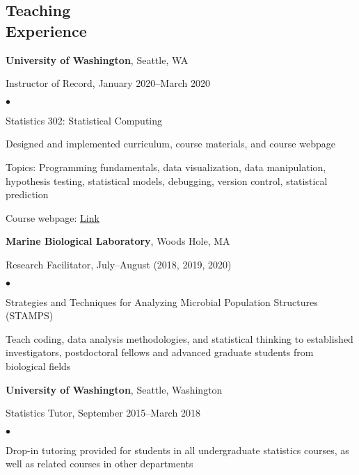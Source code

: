 \documentclass[margin,centered]{res}
\newenvironment{list1}{
  \begin{list}{\ding{113}}{%
      \setlength{\itemsep}{0in}
      \setlength{\parsep}{0in} \setlength{\parskip}{0in}
      \setlength{\topsep}{0in} \setlength{\partopsep}{0in}
      \setlength{\leftmargin}{0.17in}}}{\end{list}}
\newenvironment{list2}{
  \begin{list}{$\bullet$}{%
      \setlength{\itemsep}{0in}
      \setlength{\parsep}{0in} \setlength{\parskip}{0in}
      \setlength{\topsep}{0in} \setlength{\partopsep}{0in}
      \setlength{\leftmargin}{0.2in}}}{\end{list}}
\begin{document}
\begin{resume}
\section{\sc Teaching \\ Experience}
{\bf University of Washington}, Seattle, WA
\begin{list1}
\item[] Instructor of Record, January 2020--March 2020
\begin{list2}
\vspace*{.05in}
\item Statistics 302: Statistical Computing
\item Designed and implemented curriculum, course materials, and course webpage
\item Topics: Programming fundamentals, data visualization, data manipulation, hypothesis testing, statistical models, debugging, version control, statistical prediction
\item Course webpage: \href{https://bryandmartin.github.io/STAT302}{Link}
\end{list2}
\end{list1}


{\bf Marine Biological Laboratory}, Woods Hole, MA
\begin{list1}
\item[] Research Facilitator, July--August (2018, 2019, 2020)
\begin{list2}
\vspace*{.05in}
\item Strategies and Techniques for Analyzing Microbial Population Structures (STAMPS)
\item Teach coding, data analysis methodologies, and statistical thinking to established investigators, postdoctoral fellows and advanced graduate students from biological fields
\end{list2}
\end{list1}

{\bf University of Washington}, Seattle, Washington
\begin{list1}
\item[] Statistics Tutor, September 2015--March 2018
\begin{list2}
\vspace*{.05in}
\item Drop-in tutoring provided for students in all undergraduate statistics courses, as well as related courses in other departments
\end{list2}
\end{list1}


\end{resume}
\end{document}
